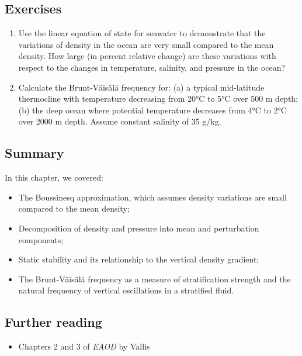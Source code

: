 \documentclass[12pt]{article}
\numberwithin{equation}{section}
\numberwithin{figure}{section}
\numberwithin{table}{section}
\begin{document}
\subsection*{Exercises}

\begin{enumerate}

  \item Use the linear equation of state for seawater to demonstrate that the
  variations of density in the ocean are very small compared to the mean
  density. How large (in percent relative change) are these variations with
  respect to the changes in temperature, salinity, and pressure in the ocean?

  \item Calculate the Brunt-Väisälä frequency for:
  (a) a typical mid-latitude thermocline with temperature decreasing from 20°C
  to 5°C over 500 m depth;
  (b) the deep ocean where potential temperature decreases from 4°C to 2°C
  over 2000 m depth.
  Assume constant salinity of 35 g/kg.

\end{enumerate}

\subsection*{Summary}

In this chapter, we covered:

\begin{itemize}
  \item The Boussinesq approximation, which assumes density variations are small
  compared to the mean density;
  \item Decomposition of density and pressure into mean and perturbation components;
  \item Static stability and its relationship to the vertical density gradient;
  \item The Brunt-Väisälä frequency as a measure of stratification strength and
  the natural frequency of vertical oscillations in a stratified fluid.
\end{itemize}

\subsection*{Further reading}

\begin{itemize}
  \item Chapters 2 and 3 of \textit{EAOD} by Vallis
\end{itemize}
\end{document}
